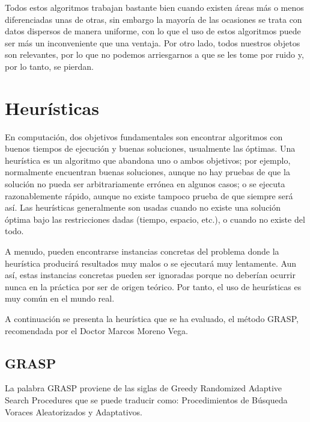 Todos estos algoritmos trabajan bastante bien cuando existen áreas más o menos 
diferenciadas unas de otras, sin embargo la mayoría de las ocasiones se trata
con datos dispersos de manera uniforme, con lo que el uso de estos algoritmos
puede ser más un inconveniente que una ventaja. Por otro lado, todos nuestros
objetos son relevantes, por lo que no podemos arriesgarnos a que se les tome por
ruido y, por lo tanto, se pierdan.

\section{Heurísticas}

En computación, dos objetivos fundamentales son encontrar algoritmos con buenos
tiempos de ejecución y buenas soluciones, usualmente las óptimas. Una heurística
es un algoritmo que abandona uno o ambos objetivos; por ejemplo, normalmente
encuentran buenas soluciones, aunque no hay pruebas de que la solución no pueda
ser arbitrariamente errónea en algunos casos; o se ejecuta razonablemente
rápido, aunque no existe tampoco prueba de que siempre será así. Las heurísticas
generalmente son usadas cuando no existe una solución óptima bajo las
restricciones dadas (tiempo, espacio, etc.), o cuando no existe del todo.

A menudo, pueden encontrarse instancias concretas del problema donde la
heurística producirá resultados muy malos o se ejecutará muy lentamente. Aun
así, estas instancias concretas pueden ser ignoradas porque no deberían ocurrir
nunca en la práctica por ser de origen teórico. Por tanto, el uso de heurísticas
es muy común en el mundo real.

A continuación se presenta la heurística que se ha evaluado, el método GRASP,
recomendada por el Doctor Marcos Moreno Vega.

\subsection{GRASP} \label{sec:grasp}


La palabra GRASP proviene de las siglas de Greedy Randomized Adaptive Search
Procedures que se puede traducir como: Procedimientos de Búsqueda Voraces 
Aleatorizados y Adaptativos.

